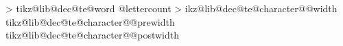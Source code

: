 {    \fi%
    \tikz@lib@dec@te@addmacroto@parameters{\tikz@lib@dec@te@charactercount}{\tikz@lib@dec@te@lettercount}%
    \tikz@lib@dec@te@addmacroto@parameters{\tikz@lib@dec@te@charactercount}{\tikz@lib@dec@te@wordcount}%
    \tikz@lib@dec@te@addmacroto@parameters{\tikz@lib@dec@te@charactercount}{\tikz@lib@dec@te@character}%
    \let\tikz@lib@dec@te@lastcharactercount=\pgfmathcounter%
  \repeatpgfmathloop%
  \let\tikz@lib@dec@te@wordtotal=\tikz@lib@dec@te@wordcount%
  \pgfmathloop
  \ifnum\pgfmathcounter>\tikz@lib@dec@te@charactertotalcount%
  \else%
    \tikz@lib@dec@te@addmacroto@parameters{\pgfmathcounter}{\tikz@lib@dec@te@charactertotalcount}%
    \tikz@lib@dec@te@addmacroto@parameters{\pgfmathcounter}{\tikz@lib@dec@te@wordtotal}%
    \expandafter\let\expandafter\tikz@lib@dec@te@lettertotalcount\expandafter=\csname tikz@lib@dec@te@word \tikz@lib@dec@te@wordcount @lettercount\endcsname%
    \tikz@lib@dec@te@addmacroto@parameters{\pgfmathcounter}{\tikz@lib@dec@te@lettertotalcount}%
  \repeatpgfmathloop%
  \def\tikz@lib@dec@te@textwidth{0pt}%
  \pgfmathloop%
  \ifnum\pgfmathcounter>\tikz@lib@dec@te@charactertotalcount%
  \else%
    \def\tikz@lib@dec@te@characterwidth{0pt}%
    \tikz@lib@dec@te@getcharacterwidth{\pgfmathcounter}%
    \expandafter\let\csname tikz@lib@dec@te@character@\pgfmathcounter @width\endcsname=\tikz@lib@dec@te@characterwidth%
    \pgf@x=\tikz@lib@dec@te@characterwidth\relax%
    \pgf@x%
    \expandafter\edef\csname tikz@lib@dec@te@character@\pgfmathcounter @prewidth\endcsname{\the\pgf@x}%
    \expandafter\edef\csname tikz@lib@dec@te@character@\pgfmathcounter @postwidth\endcsname{\the\pgf@x}%
    \tikz@lib@dec@te@advancedimenmacro{\tikz@lib@dec@te@textwidth}{\tikz@lib@dec@te@characterwidth}%
  \repeatpgfmathloop%
}%

\def\tikz@lib@dec@te@spacetoken{ }%

\let\tikz@lib@dec@te@wordsep=\tikz@lib@dec@te@spacetoken


\def\tikz@lib@dec@te@scancharacters#1{%
  \def\tikz@lib@dec@te@@@scancharacters@process{#1}%
  \def\tikz@lib@dec@te@scancount{0}%
  \expandafter\tikz@lib@dec@te@@scancharacters\tikz@lib@dec@te@text\tikz@lib@dec@te@scancharacters}%

\def\tikz@lib@dec@te@@scancharacters{%
  \futurelet\tikz@lib@dec@te@token\tikz@lib@dec@te@@@scancharacters}%

\def\tikz@lib@dec@te@@@scancharacters{%
  \ifx\tikz@lib@dec@te@token\tikz@lib@dec@te@scancharacters%
    \let\tikz@lib@dec@te@next=\tikz@lib@dec@te@@@@scancharacters%
  \else%
    \tikz@lib@dec@te@advancecountmacro\tikz@lib@dec@te@scancount{1}%
    \ifx\tikz@lib@dec@te@token\pgfutil@sptoken%
      \let\tikz@lib@dec@te@next=\tikz@lib@dec@te@@@scancharacters@space%
    \else%
      \ifx\tikz@lib@dec@te@token\bgroup%
        \let\tikz@lib@dec@te@next=\tikz@lib@dec@te@@@scancharacters@bgroup%
      \else%
        \let\tikz@lib@dec@te@next=\tikz@lib@dec@te@@@scancharacters@normal%
      \fi%
    \fi%
  \fi%
  \tikz@lib@dec@te@next%
}%


